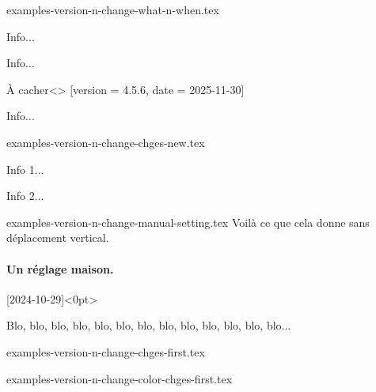 \begin{filecontents*}[overwrite]{examples-version-n-change-what-n-when.tex}
\begin{tdoctech}[date      = 2024-10-29,
                 col-chges = red]
    \item Info...
\end{tdoctech}

\begin{tdocupdate}[version   = 1.2.3,
                   col-chges = ForestGreen,
                   col       = ForestGreen]
    \item Info...
\end{tdocupdate}

\begin{tdoctopic}{À cacher}<\faEyeSlash>%
                 [version = 4.5.6,
                  date    = 2025-11-30]
    \item Info...
\end{tdoctopic}
\end{filecontents*}


\begin{filecontents*}[overwrite]{examples-version-n-change-chges-new.tex}
\begin{tdocnew}
    \item Info 1...
    \item Info 2...
\end{tdocnew}
\end{filecontents*}


\begin{filecontents*}[overwrite]{examples-version-n-change-manual-setting.tex}
Voilà ce que cela donne sans déplacement vertical.

\paragraph{Un réglage maison.}%
[2024-10-29]<0pt>

Blo, blo, blo, blo, blo, blo, blo, blo, blo, blo, blo, blo, blo...
\end{filecontents*}


\begin{filecontents*}[overwrite]{examples-version-n-change-chges-first.tex}
\end{filecontents*}


\begin{filecontents*}[overwrite]{examples-version-n-change-color-chges-first.tex}
\end{filecontents*}


